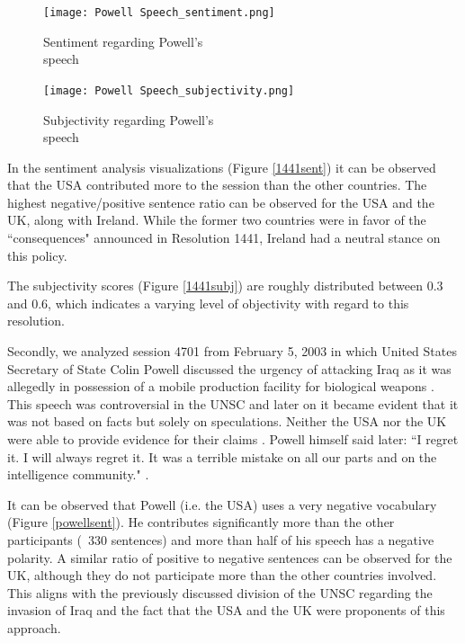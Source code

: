 \begin{figure}[b!]
    \centering
    \begin{minipage}{0.45\textwidth}
        \centering
        \texttt{[image: Powell Speech\_sentiment.png]} %
        \caption{Sentiment regarding Powell's \\ speech}
        \label{powellsent}
    \end{minipage}\hfill
    \begin{minipage}{0.45\textwidth}
        \centering
        \texttt{[image: Powell Speech\_subjectivity.png]} %
        \caption{Subjectivity regarding Powell's \\ speech}
        \label{powellsubj}
    \end{minipage}
\end{figure}

In the sentiment analysis visualizations (Figure \ref{1441sent}) it can be observed that the USA contributed more to the session than the other countries. The highest negative/positive sentence ratio can be observed for the USA and the UK, along with Ireland. While the former two countries were in favor of the ``consequences" announced in Resolution 1441, Ireland had a neutral stance on this policy.

The subjectivity scores (Figure \ref{1441subj}) are roughly distributed between 0.3 and 0.6, which indicates a varying level of objectivity with regard to this resolution.

Secondly, we analyzed session 4701 from February 5, 2003 in which United States Secretary of State Colin Powell discussed the urgency of attacking Iraq as it was allegedly in possession of a mobile production facility for biological weapons \citep{cia}. This speech was controversial in the UNSC and later on it became evident that it was not based on facts but solely on speculations. Neither the USA nor the UK were able to provide evidence for their claims \citep{iraqev}. 
Powell himself said later: ``I regret it. I will always regret it. It was a terrible mistake on all our parts and on the intelligence community." \citep{powell}.

It can be observed that Powell (i.e. the USA) uses a very negative vocabulary (Figure \ref{powellsent}). He contributes significantly more than the other participants (~330 sentences) and more than half of his speech has a negative polarity. A similar ratio of positive to negative sentences can be observed for the UK, although they do not participate more than the other countries involved. This aligns with the previously discussed division of the UNSC regarding the invasion of Iraq and the fact that the USA and the UK were proponents of this approach.

